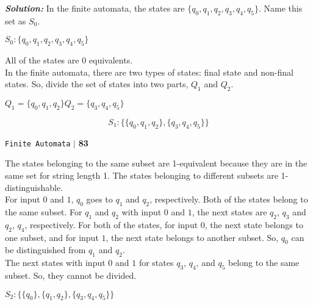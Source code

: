 \documentclass{article}
\begin{document}
\emph{\textbf{Solution:}} In the finite automata, the states are $\{q_0, q_1, q_2, q_3, q_4, q_5\}$. Name this set as $S_0$.
\begin{center}
$S_0: \{q_0, q_1, q_2, q_3, q_4, q_5\}$
\end{center}

All of the states are 0 equivalents.\\
\hspace*{0.2cm} In the finite automata, there are two types of states: final state and non-final states. So, divide the set
of states into two parts, $Q_1$ and $Q_2$.\\

\begin{center}
$Q_1 = \{q_0, q_1, q_2\} Q_2 = \{q_3, q_4, q_5\}$

\vspace*{0.1cm}
\[
S_1: \{\{q_0, q_1, q_2\}, \{q_3, q_4, q_5\}\}
\]
\end{center}


\begin{flushright}
 \texttt{Finite Automata} \hspace*{0.1cm}\textbf{$|$} \hspace*{0.1cm} \textbf{83}\hspace*{0.1cm}
\end{flushright}

\vspace*{1cm}
The states belonging to the same subset are 1-equivalent because they are in the same set for string
length 1. The states belonging to different subsets are 1-distinguishable.\\
\hspace*{0.1cm} For input $0$ and $1$, $q_0$ goes to $q_1$ and $q_2$, respectively. Both of the states belong to the same subset. For
$q_1$ and $q_2$ with input $0$ and $1$, the next states are $q_2$, $q_3$ and $q_2$, $q_4$, respectively. For both of the states, for
input $0$, the next state belongs to one subset, and for input $1$, the next state belongs to another subset. So,
$q_0$ can be distinguished from $q_1$ and $q_2$.\\
\hspace*{0.1cm}The next states with input $0$ and $1$ for states $q_3$, $q_4$, and $q_5$ belong to the same subset. So, they cannot
be divided.

\vspace*{1cm}
\begin{center}
$S_2: \{\{q_0\}, \{q_1, q_2\}, \{q_3, q_4, q_5\}\}$
\end{center}
\end{document}
